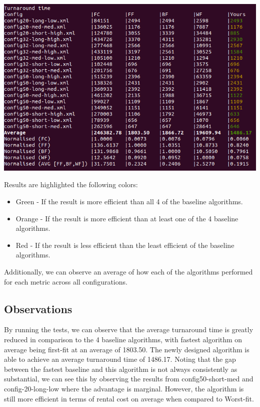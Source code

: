 \documentclass[a4paper]{article}
\begin{document}
\begin{center}
    \includegraphics[scale=0.35]{images/simulation-result.png}
\end{center}

Results are highlighted the following colors:
\begin{itemize}
  \item Green - If the result is more efficient than all 4 of the baseline algorithms.
  \item Orange - If the result is more efficient than at least one of the 4 baseline algorithms.
  \item Red - If the result is less efficient than the least efficient of the baseline algorithms.
\end{itemize}

Additionally, we can observe an average of how each of the algorithms performed for each metric across all configurations.

\subsection{Observations}
By running the tests, we can observe that the average turnaround time is greatly reduced in comparison to the 4 baseline algorithms, with fastest algorithm on average being first-fit at an average of 1803.50. The newly designed algorithm is able to achieve an average turnaround time of 1486.17. Noting that the gap between the fastest baseline and this algorithm is not always consistently as substantial, we can see this by observing the results from config50-short-med and config-20-long-low where the advantage is marginal. However, the algorithm is still more efficient in terms of rental cost on average when compared to Worst-fit.
\end{document}
